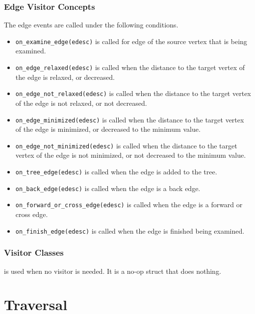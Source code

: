 \subsubsection{Edge Visitor Concepts}
{\small
      
}
The edge events are called under the following conditions.
\begin{itemize}
      \item \lstinline{on_examine_edge(edesc)} is called for edge of the source vertex that is
            being examined.
      \item \lstinline{on_edge_relaxed(edesc)} is called when the distance to the target vertex of the edge
            is relaxed, or decreased.
      \item \lstinline{on_edge_not_relaxed(edesc)} is called when the distance to the target vertex of the edge
            is not relaxed, or not decreased.
      \item \lstinline{on_edge_minimized(edesc)} is called when the distance to the target vertex of the edge
            is minimized, or decreased to the minimum value.
      \item \lstinline{on_edge_not_minimized(edesc)} is called when the distance to the target vertex of the edge
            is not minimized, or not decreased to the minimum value.
      \item \lstinline{on_tree_edge(edesc)} is called when the edge is added to the tree.
      \item \lstinline{on_back_edge(edesc)} is called when the edge is a back edge.
      \item \lstinline{on_forward_or_cross_edge(edesc)} is called when the edge is a forward or cross edge.
      \item \lstinline{on_finish_edge(edesc)} is called when the edge is finished being examined.
\end{itemize}


\subsubsection{Visitor Classes}
 is used when no visitor is needed. It is a no-op struct that does nothing.
{\small
      
}



\section{Traversal}

